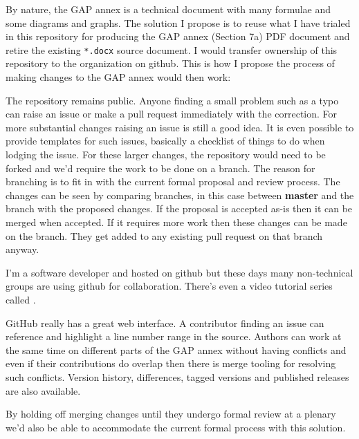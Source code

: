 \documentclass{article}
\begin{document}
By nature, the GAP annex is a technical document with many formulae and some
diagrams and graphs. The solution I propose is to reuse what I have trialed in
this repository for producing the GAP annex (Section 7a) PDF document and
retire the existing \texttt{*.docx} source document. I would transfer ownership
of this repository to the 
organization on github. This is how I propose the process of making changes to
the GAP annex would then work:

The repository remains public. Anyone finding a small problem such as a typo
can raise an issue or make a pull request immediately with the correction. For
more substantial changes raising an issue is still a good idea. It is even
possible to provide templates for such issues, basically a checklist of things
to do when lodging the issue. For these larger changes, the repository would
need to be forked and we'd require the work to be done on a branch. The reason
for branching is to fit in with the current formal proposal and review process.
The changes can be seen by comparing branches, in this case between
\textbf{master} and the branch with the proposed changes. If the proposal is
accepted as-is then it can be merged when accepted. If it requires more work
then these changes can be made on the branch. They get added to any existing
pull request on that branch anyway.

I'm a software developer and  hosted on github but these days many non-technical groups are
using github for collaboration.  There's even a video tutorial series called
.

GitHub really has a great web interface. A contributor finding an issue can
reference and highlight a line number range in the source. Authors can work at
the same time on different parts of the GAP annex without having conflicts and
even if their contributions do overlap then there is merge tooling for
resolving such conflicts.  Version history, differences, tagged versions and
published releases are also available.

By holding off merging changes until they undergo formal review at a plenary
we'd also be able to accommodate the current formal process with this solution.
\end{document}
